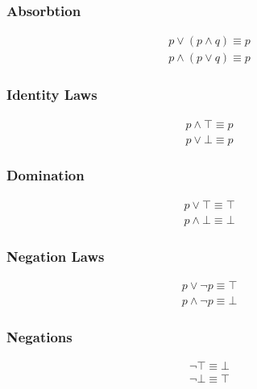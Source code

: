 \documentclass{report}
\begin{document}
\begin{multicols}{2}
	\subsubsection*{Absorbtion}
	\begin{align*}
		p \lor (p \land q) \equiv p \\
		p \land (p \lor q) \equiv p 
	\end{align*}
	
	\subsubsection*{Identity Laws}
	\begin{align*}
		p \land \top \equiv p \\
		p \lor \bot \equiv p	
	\end{align*}
	
	\subsubsection*{Domination}
	\begin{align*}
		p \lor \top \equiv \top \\
		p \land \bot \equiv \bot
	\end{align*}
	
	\subsubsection*{Negation Laws}
	\begin{align*}
		p \lor \lnot p \equiv \top \\
		p \land \lnot p \equiv \bot
	\end{align*}
	
	\subsubsection*{Negations}
	\begin{align*}
		\lnot\top\equiv\bot \\
		\lnot\bot\equiv\top
	\end{align*}
\end{multicols}

\end{document}
